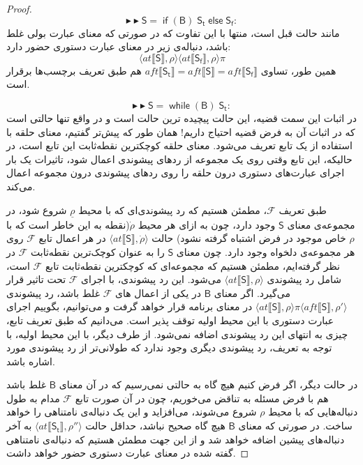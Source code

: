 \begin{proof}
$$\blacktriangleright\blacktriangleright \mathsf{S=\; if\;(B)\;S_t\;else\;S_f}:$$
مانند حالت قبل است، منتها با این تفاوت که در صورتی که معنای عبارت بولی غلط باشد، دنباله‌ی زیر در معنای عبارت‌ دستوری حضور دارد:
	$$\langle at \llbracket \mathsf{S} \rrbracket , \rho \rangle
\langle at \llbracket \mathsf{S_f} \rrbracket , \rho \rangle \pi$$
همین ‌طور، تساوی 
$aft \llbracket \mathsf{S_t} \rrbracket=aft \llbracket \mathsf{S} \rrbracket=aft \llbracket \mathsf{S_f} \rrbracket$
هم طبق تعریف برچسب‌ها برقرار است.

$$\blacktriangleright\blacktriangleright \mathsf{S=\; while\;(B)\;S_t}:$$
در اثبات این سمت قضیه، این حالت پیچیده ترین حالت است و در واقع تنها حالتی است که در اثبات آن به فرض قضیه احتیاج داریم! همان طور که پیش‌تر گفتیم، معنای حلقه با استفاده از یک تابع تعریف می‌شود. معنای حلقه کوچکترین نقطه‌ثابت این تابع است، در حالیکه، این تابع وقتی روی یک مجموعه از ردهای پیشوندی اعمال شود، تاثیرات یک بار اجرای عبارت‌های دستوری درون حلقه را روی ردهای پیشوندی درون مجموعه اعمال می‌کند.

طبق تعریف $\mathcal{F}$، مطمئن هستیم که رد پیشوندی‌ای که با محیط $\underline{\rho}$ شروع شود، در مجموعه‌ی معنای $\mathsf{S}$ وجود دارد، چون به ازای هر محیط $\dot{\rho}$(نقطه به این خاطر است که با $\rho$ خاص موجود در فرض اشتباه گرفته نشود) حالت 
$\langle at \llbracket \mathsf{S} \rrbracket, \dot{\rho} \rangle$
 در هر اعمال تابع $\mathcal{F}$ روی هر مجموعه‌ی دلخواه وجود دارد. چون معنای $\mathsf{S}$ را به عنوان کوچک‌ترین نقطه‌ثابت $\mathcal{F}$ در نظر گرفته‌ایم، مطمئن هستیم که مجموعه‌ای که کوچکترین نقطه‌ثابت تابع $\mathcal{F}$ است، شامل رد پیشوندی 
 $\langle at \llbracket \mathsf{S} \rrbracket, \rho \rangle$
 می‌شود. این رد پیشوندی، با اجرای $\mathcal{F}$ تحت تاثیر قرار می‌گیرد. اگر معنای $\mathsf{B}$ در یکی از اعمال های $\mathcal{F}$ غلط باشد، رد پیشوندی
$ \langle at \llbracket \mathsf{S} \rrbracket, \rho \rangle \pi \langle aft \llbracket \mathsf{S} \rrbracket , \rho' \rangle$ 
در معنای برنامه قرار خواهد گرفت و می‌توانیم، بگوییم اجرای عبارت‌ دستوری با این محیط اولیه توقف پذیر است. می‌دانیم که طبق تعریف تابع، چیزی به انتهای این رد پیشوندی اضافه نمی‌شود. از طرف دیگر، با این محیط اولیه، با توجه به تعریف، رد پیشوندی دیگری وجود ندارد که طولانی‌تر از رد پیشوندی مورد اشاره باشد. 

در حالت دیگر، اگر فرض کنیم هیچ گاه به حالتی نمی‌رسیم که در آن معنای $\mathsf{B}$ غلط باشد هم با فرض مسئله به تناقض می‌خوریم، چون در آن صورت تابع $\mathcal{F}$ مدام به طول دنباله‌‌هایی که با محیط $\rho$ شروع می‌شوند، می‌افزاید و این یک دنباله‌ی نامتناهی را خواهد ساخت. در صورتی که معنای $\mathsf{B}$ هیچ گاه صحیح نباشد، حداقل حالت 
$\langle at \llbracket \mathsf{S_t} \rrbracket , \rho'' \rangle$
به آخر دنباله‌های پیشین اضافه خواهد شد و از این جهت مطمئن هستیم که دنباله‌ی نامتناهی گفته شده در معنای عبارت‌ دستوری حضور خواهد داشت. 


\end{proof}
